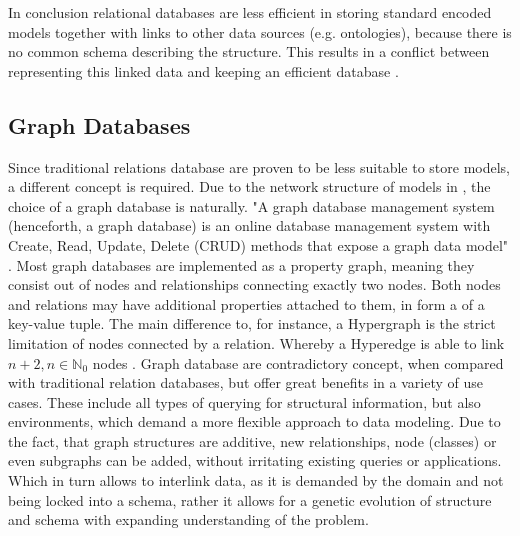 In conclusion relational databases are less efficient in storing standard encoded models together with links to other data sources (e.g. ontologies), because there is no common schema describing the structure. This results in a conflict between representing this linked data and keeping an efficient database \citep{Henkel2015}.

\subsection{Graph Databases}
\label{sec:background:graph-db:neo4j}
Since traditional relations database are proven to be less suitable to store models, a different concept is required. Due to the network structure of models in \sysbio, the choice of a graph database is naturally.
"A graph database management system (henceforth, a graph database) is an online database management system with Create, Read, Update, Delete (CRUD) methods that expose a graph data model" \citep{Robinson2013}.
Most graph databases are implemented as a property graph, meaning they consist out of nodes and relationships connecting exactly two nodes. Both nodes and relations may have additional properties attached to them, in form a of a key-value tuple.
The main difference to, for instance, a Hypergraph is the strict limitation of nodes connected by a relation. Whereby a Hyperedge is able to link $n+2, n \in \mathbb{N}_0$ nodes \citep[Appendix A]{Robinson2013}.
Graph database are contradictory concept, when compared with traditional relation databases, but offer great benefits in a variety of use cases. These include all types of querying for structural information, but also environments, which demand a more flexible approach to data modeling. 
Due to the fact, that graph structures are additive, new relationships, node (classes) or even subgraphs can be added, without irritating existing queries or applications. Which in turn allows to interlink data, as it is demanded by the domain and not being locked into a schema, rather it allows for a genetic evolution of structure and schema with expanding understanding of the problem. \citep{Robinson2013}

